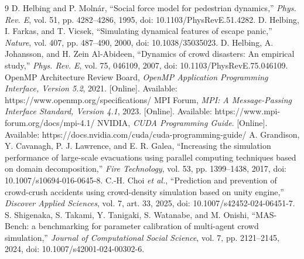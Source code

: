 \documentclass[conference]{IEEEtran}
\begin{document}
\begin{thebibliography}{9}
 D. Helbing and P. Moln\'ar, ``Social force model for pedestrian dynamics,'' \emph{Phys. Rev. E}, vol. 51, pp. 4282--4286, 1995, doi: 10.1103/PhysRevE.51.4282.
 D. Helbing, I. Farkas, and T. Vicsek, ``Simulating dynamical features of escape panic,'' \emph{Nature}, vol. 407, pp. 487--490, 2000, doi: 10.1038/35035023.
 D. Helbing, A. Johansson, and H. Zein Al-Abideen, ``Dynamics of crowd disasters: An empirical study,'' \emph{Phys. Rev. E}, vol. 75, 046109, 2007, doi: 10.1103/PhysRevE.75.046109.
 OpenMP Architecture Review Board, \emph{OpenMP Application Programming Interface, Version 5.2}, 2021. [Online]. Available: https://www.openmp.org/specifications/
 MPI Forum, \emph{MPI: A Message-Passing Interface Standard, Version 4.1}, 2023. [Online]. Available: https://www.mpi-forum.org/docs/mpi-4.1/
 NVIDIA, \emph{CUDA Programming Guide}. [Online]. Available: https://docs.nvidia.com/cuda/cuda-programming-guide/
 A. Grandison, Y. Cavanagh, P. J. Lawrence, and E. R. Galea, ``Increasing the simulation performance of large-scale evacuations using parallel computing techniques based on domain decomposition,'' \emph{Fire Technology}, vol. 53, pp. 1399--1438, 2017, doi: 10.1007/s10694-016-0645-8.
 C.-H. Choi \emph{et al.}, ``Prediction and prevention of crowd-crush accidents using crowd-density simulation based on unity engine,'' \emph{Discover Applied Sciences}, vol. 7, art. 33, 2025, doi: 10.1007/s42452-024-06451-7.
 S. Shigenaka, S. Takami, Y. Tanigaki, S. Watanabe, and M. Onishi, ``MAS-Bench: a benchmarking for parameter calibration of multi-agent crowd simulation,'' \emph{Journal of Computational Social Science}, vol. 7, pp. 2121--2145, 2024, doi: 10.1007/s42001-024-00302-6.
\end{thebibliography}
\end{document}
